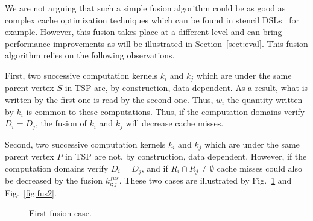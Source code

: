 We are not arguing that such a simple fusion algorithm could be as good as complex cache optimization techniques which can be found in stencil DSLs~\cite{spaaTangCKLL11} for example. However, this fusion takes place at a different level and can bring performance improvements as will be illustrated in Section~\ref{sect:eval}. This fusion algorithm relies on the following observations.

First, two successive computation kernels $k_i$ and $k_j$ which are under the same parent vertex $S$ in TSP are, by construction, data dependent. As a result, what is written by the first one is read by the second one. Thus, $w_i$ the quantity written by $k_i$ is common to these computations. Thus, if the computation domains verify $D_i=D_j$, the fusion of $k_i$ and $k_j$ will decrease cache misses.

Second, two successive computation kernels $k_i$ and $k_j$ which are under the same parent vertex $P$ in TSP are not, by construction, data dependent. However, if the computation domains verify $D_i=D_j$, and if $R_i \cap R_j \neq \emptyset$ cache misses could also be decreased by the fusion $k_{i;j}^{fus}$.
These two cases are illustrated by Fig.~\ref{fig:fus1} and Fig.~\ref{fig:fus2}.

\begin{figure}[h!]
\begin{center}
\caption{First fusion case.}
\label{fig:fus1}
\end{center}
\end{figure}

